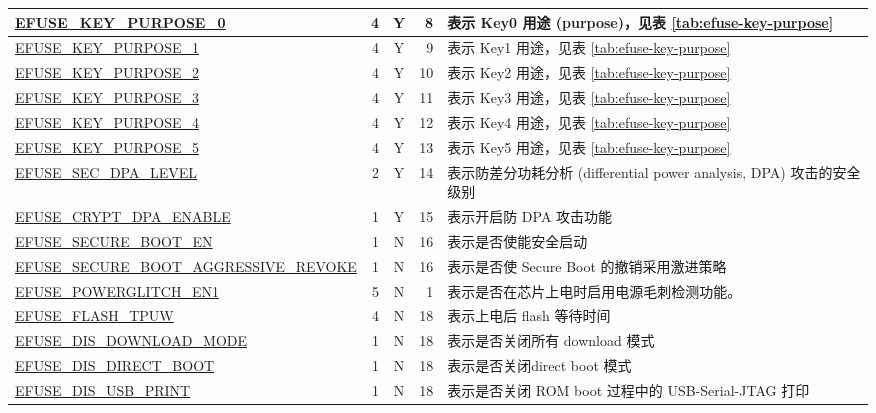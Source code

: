 \begin{longtable}[l]{ |m{8.2cm}|r|c|r|m{9.3cm}| }
    \hline
    \hyperref[fielddesc:EFUSEKEYPURPOSE0]{EFUSE\_KEY\_PURPOSE\_0} & 4 & Y & 8 & {表示 Key0 用途 (purpose)，见表 \ref{tab:efuse-key-purpose}} \\
    \hline
    \hyperref[fielddesc:EFUSEKEYPURPOSE1]{EFUSE\_KEY\_PURPOSE\_1} & 4 & Y & 9 & {表示 Key1 用途，见表 \ref{tab:efuse-key-purpose}} \\
    \hline
    \hyperref[fielddesc:EFUSEKEYPURPOSE2]{EFUSE\_KEY\_PURPOSE\_2} & 4 & Y & 10 & {表示 Key2 用途，见表 \ref{tab:efuse-key-purpose}} \\
    \hline
    \hyperref[fielddesc:EFUSEKEYPURPOSE3]{EFUSE\_KEY\_PURPOSE\_3} & 4 & Y & 11 & {表示 Key3 用途，见表 \ref{tab:efuse-key-purpose}} \\
    \hline
    \hyperref[fielddesc:EFUSEKEYPURPOSE4]{EFUSE\_KEY\_PURPOSE\_4} & 4 & Y & 12 & {表示 Key4 用途，见表 \ref{tab:efuse-key-purpose}} \\
    \hline
    \hyperref[fielddesc:EFUSEKEYPURPOSE5]{EFUSE\_KEY\_PURPOSE\_5} & 4 & Y & 13 & {表示 Key5 用途，见表 \ref{tab:efuse-key-purpose}} \\
    \hline
    \hyperref[fielddesc:EFUSESECDPALEVEL]{EFUSE\_SEC\_DPA\_LEVEL} & 2 & Y & 14 & 表示防差分功耗分析 (differential power analysis, DPA)  攻击的安全级别\\
    \hline
    \hyperref[fielddesc:EFUSECRYPTDPAENABLE]{EFUSE\_CRYPT\_DPA\_ENABLE} & 1 & Y & 15 & 表示开启防 DPA 攻击功能 \\
    \hline
    \hyperref[fielddesc:EFUSESECUREBOOTEN]{EFUSE\_SECURE\_BOOT\_EN} & 1 & N & 16 & 表示是否使能安全启动 \\
    \hline
    \hyperref[fielddesc:EFUSESECUREBOOTAGGRESSIVEREVOKE]{EFUSE\_SECURE\_BOOT\_AGGRESSIVE\_REVOKE} & 1 & N & 16 & 表示是否使 Secure Boot 的撤销采用激进策略 \\
    \hline
    \hyperref[fielddesc:EFUSEPOWERGLITCHEN1]{EFUSE\_POWERGLITCH\_EN1}  & 5 & N & 1 & 表示是否在芯片上电时启用电源毛刺检测功能。 \\ \hline
    \hyperref[fielddesc:EFUSEFLASHTPUW]{EFUSE\_FLASH\_TPUW} & 4 & N & 18 & 表示上电后 flash 等待时间 \\
    \hline
    \hyperref[fielddesc:EFUSEDISDOWNLOADMODE]{EFUSE\_DIS\_DOWNLOAD\_MODE} & 1 & N & 18 & 表示是否关闭所有 download 模式\\
    \hline
    \hyperref[fielddesc:EFUSEDISDIRECTBOOT]{EFUSE\_DIS\_DIRECT\_BOOT} & 1 & N & 18 & 表示是否关闭direct boot 模式\\
    \hline
    \hyperref[fielddesc:EFUSEDISUSBPRINT]{EFUSE\_DIS\_USB\_PRINT} & 1 & N & 18 & 表示是否关闭 ROM boot 过程中的 USB-Serial-JTAG 打印\\

\end{longtable}
